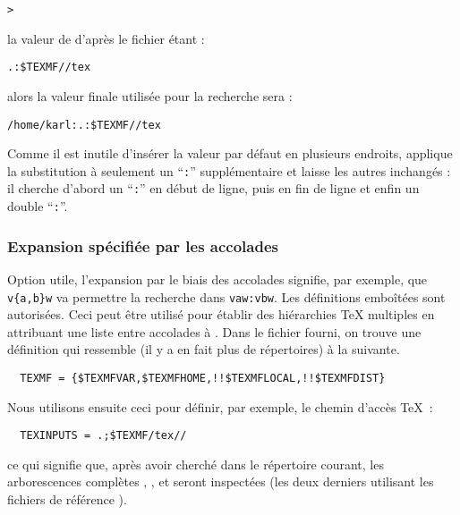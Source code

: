 \documentclass[german, english, french, 12pt]{article}
\renewcommand{\samp}[1]{\enquote{\texttt{#1}}}
\begin{document}
\begin{alltt}
> 
\end{alltt}
la valeur de  d'après le fichier  étant :

\begin{alltt}
  .:\$TEXMF//tex
\end{alltt}
alors la valeur finale utilisée pour la recherche sera :

\begin{alltt}
  /home/karl:.:\$TEXMF//tex
\end{alltt}

Comme il est inutile d'insérer la valeur par défaut en plusieurs endroits,
\KPS{} applique la substitution à seulement un \samp{:} supplémentaire et laisse
les autres inchangés : il cherche d'abord un \samp{:} en début de ligne, puis en
fin de ligne et enfin un double \samp{:}.

\subsubsection{Expansion spécifiée par les accolades}
\label{sec:brace-expansion}

Option utile, l'expansion par le biais des accolades signifie, par exemple, que
\verb+v{a,b}w+ va permettre la recherche dans \verb+vaw:vbw+. Les définitions
emboîtées sont autorisées. Ceci peut être utilisé pour établir des hiérarchies
\TeX{} multiples en attribuant une liste entre accolades à . Dans
le fichier  fourni, on trouve une définition qui ressemble (il
y a en fait plus de répertoires) à la suivante.
\begin{verbatim}
  TEXMF = {$TEXMFVAR,$TEXMFHOME,!!$TEXMFLOCAL,!!$TEXMFDIST}
\end{verbatim}
Nous utilisons ensuite ceci pour définir, par exemple, le chemin d'accès \TeX\ :
\begin{verbatim}
  TEXINPUTS = .;$TEXMF/tex//
\end{verbatim}
ce qui signifie que, après avoir cherché dans le répertoire courant, les
arborescences complètes , ,
 et  seront inspectées (les deux
derniers utilisant les fichiers de référence ).
\end{document}
